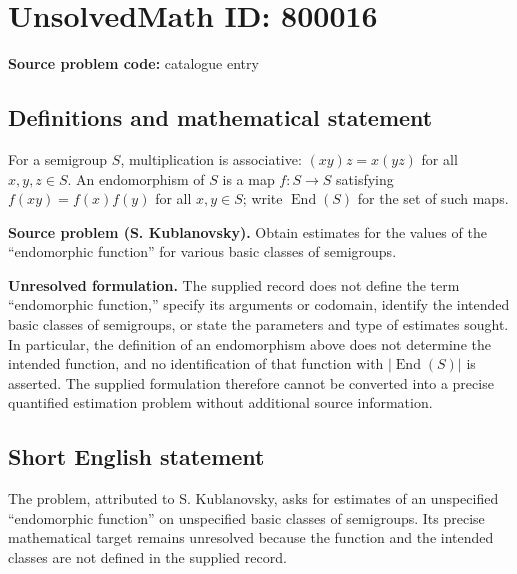 \documentclass[11pt]{article}
\begin{document}
\section*{UnsolvedMath ID: 800016}
\textbf{Source problem code:} catalogue entry
\subsection{Definitions and mathematical statement}
For a semigroup \(S\), multiplication is associative: \((xy)z=x(yz)\) for all \(x,y,z\in S\). An endomorphism of \(S\) is a map \(f:S\to S\) satisfying \(f(xy)=f(x)f(y)\) for all \(x,y\in S\); write \(\operatorname{End}(S)\) for the set of such maps.

\textbf{Source problem (S. Kublanovsky).} Obtain estimates for the values of the ``endomorphic function'' for various basic classes of semigroups.

\textbf{Unresolved formulation.} The supplied record does not define the term ``endomorphic function,'' specify its arguments or codomain, identify the intended basic classes of semigroups, or state the parameters and type of estimates sought. In particular, the definition of an endomorphism above does not determine the intended function, and no identification of that function with \(\lvert\operatorname{End}(S)\rvert\) is asserted. The supplied formulation therefore cannot be converted into a precise quantified estimation problem without additional source information.
\subsection{Short English statement}
The problem, attributed to S. Kublanovsky, asks for estimates of an unspecified ``endomorphic function'' on unspecified basic classes of semigroups. Its precise mathematical target remains unresolved because the function and the intended classes are not defined in the supplied record.
\end{document}

